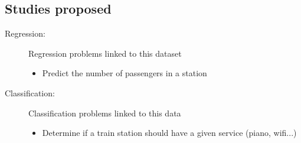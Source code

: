 \documentclass[10pt,a4paper,hidelinks]{article}
\begin{document}
\subsection{Studies proposed}
\begin{description}
    \item[Regression:] Regression problems linked to this dataset
        \begin{itemize}
            \item Predict the number of passengers in a station
        \end{itemize}
    \item[Classification:] Classification problems linked to this data
        \begin{itemize}
            \item Determine if a train station should have a given service (piano, wifi...)
        \end{itemize}
\end{description}
\end{document}
